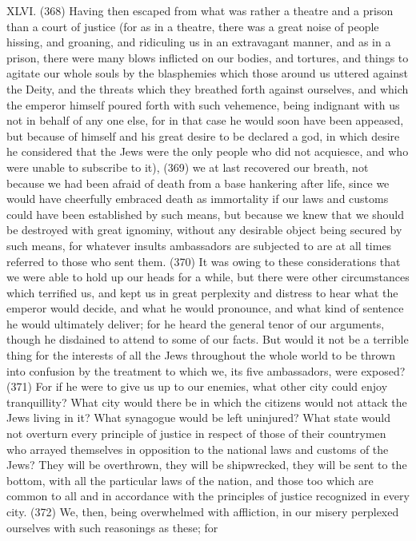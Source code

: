 XLVI. (368) Having then escaped from what was rather a theatre and a prison than a court of
justice (for as in a theatre, there was a great noise of people hissing, and groaning, and ridiculing
us in an extravagant manner, and as in a prison, there were many blows inflicted on our bodies,
and tortures, and things to agitate our whole souls by the blasphemies which those around us
uttered against the Deity, and the threats which they breathed forth against ourselves, and which
the emperor himself poured forth with such vehemence, being indignant with us not in behalf of any
one else, for in that case he would soon have been appeased, but because of himself and his
great desire to be declared a god, in which desire he considered that the Jews were the only
people who did not acquiesce, and who were unable to subscribe to it), (369) we at last recovered
our breath, not because we had been afraid of death from a base hankering after life, since we
would have cheerfully embraced death as immortality if our laws and customs could have been
established by such means, but because we knew that we should be destroyed with great ignominy,
without any desirable object being secured by such means, for whatever insults ambassadors are
subjected to are at all times referred to those who sent them. (370) It was owing to these
considerations that we were able to hold up our heads for a while, but there were other
circumstances which terrified us, and kept us in great perplexity and distress to hear what the
emperor would decide, and what he would pronounce, and what kind of sentence he would
ultimately deliver; for he heard the general tenor of our arguments, though he disdained to attend to
some of our facts. But would it not be a terrible thing for the interests of all the Jews throughout the
whole world to be thrown into confusion by the treatment to which we, its five ambassadors, were
exposed? (371) For if he were to give us up to our enemies, what other city could enjoy tranquillity?
What city would there be in which the citizens would not attack the Jews living in it? What
synagogue would be left uninjured? What state would not overturn every principle of justice in
respect of those of their countrymen who arrayed themselves in opposition to the national laws and
customs of the Jews? They will be overthrown, they will be shipwrecked, they will be sent to the
bottom, with all the particular laws of the nation, and those too which are common to all and in
accordance with the principles of justice recognized in every city. (372) We, then, being
overwhelmed with affliction, in our misery perplexed ourselves with such reasonings as these; for
